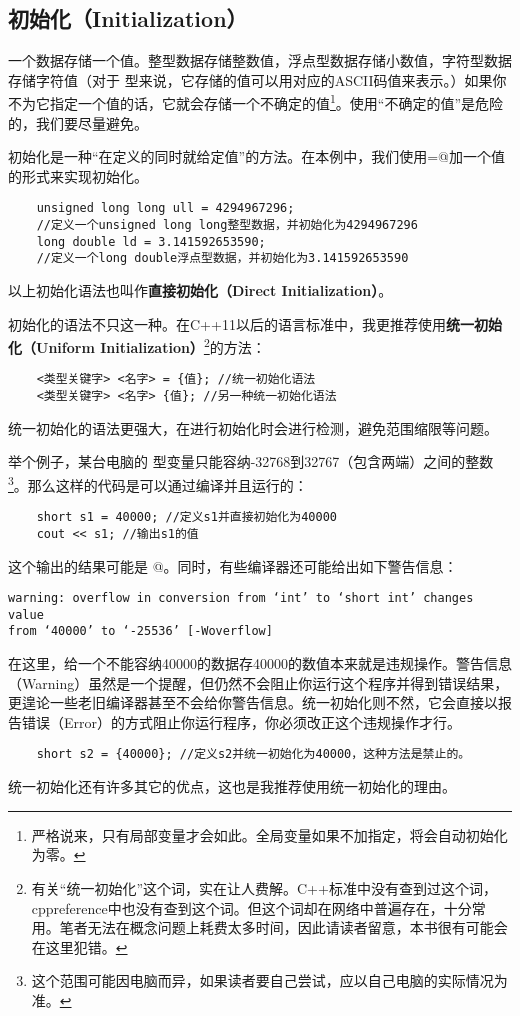 \subsection*{初始化（Initialization）}
一个数据存储一个值。整型数据存储整数值，浮点型数据存储小数值，字符型数据存储字符值（对于 \lstinline@char@ 型来说，它存储的值可以用对应的ASCII码值来表示。）如果你不为它指定一个值的话，它就会存储一个不确定的值\footnote{严格说来，只有局部变量才会如此。全局变量如果不加指定，将会自动初始化为零。}。使用``不确定的值''是危险的，我们要尽量避免。\par
初始化是一种``在定义的同时就给定值''的方法。在本例中，我们使用\lstinline@=@加一个值的形式来实现初始化。
\begin{lstlisting}
    unsigned long long ull = 4294967296;
    //定义一个unsigned long long整型数据，并初始化为4294967296
    long double ld = 3.141592653590;
    //定义一个long double浮点型数据，并初始化为3.141592653590
\end{lstlisting}
以上初始化语法也叫作\textbf{直接初始化（Direct Initialization）}。\par
初始化的语法不只这一种。在C++11以后的语言标准中，我更推荐使用\textbf{统一初始化（Uniform Initialization）}\footnote{有关``统一初始化''这个词，实在让人费解。C++标准中没有查到过这个词，cppreference中也没有查到这个词。但这个词却在网络中普遍存在，十分常用。笔者无法在概念问题上耗费太多时间，因此请读者留意，本书很有可能会在这里犯错。}的方法：
\begin{lstlisting}
    <类型关键字> <名字> = {值}; //统一初始化语法
    <类型关键字> <名字> {值}; //另一种统一初始化语法
\end{lstlisting}
统一初始化的语法更强大，在进行初始化时会进行检测，避免范围缩限等问题。\par
举个例子，某台电脑的 \lstinline@short@ 型变量只能容纳-32768到32767（包含两端）之间的整数\footnote{这个范围可能因电脑而异，如果读者要自己尝试，应以自己电脑的实际情况为准。}。那么这样的代码是可以通过编译并且运行的：
\begin{lstlisting}
    short s1 = 40000; //定义s1并直接初始化为40000
    cout << s1; //输出s1的值
\end{lstlisting}
这个输出的结果可能是 @。同时，有些编译器还可能给出如下警告信息：
\begin{lstlisting}
warning: overflow in conversion from ‘int’ to ‘short int’ changes value
from ‘40000’ to ‘-25536’ [-Woverflow]
\end{lstlisting}\par
在这里，给一个不能容纳40000的数据存40000的数值本来就是违规操作。警告信息（Warning）虽然是一个提醒，但仍然不会阻止你运行这个程序并得到错误结果，更遑论一些老旧编译器甚至不会给你警告信息。统一初始化则不然，它会直接以报告错误（Error）的方式阻止你运行程序，你必须改正这个违规操作才行。
\begin{lstlisting}
    short s2 = {40000}; //定义s2并统一初始化为40000，这种方法是禁止的。
\end{lstlisting}\par
统一初始化还有许多其它的优点，这也是我推荐使用统一初始化的理由。\par
